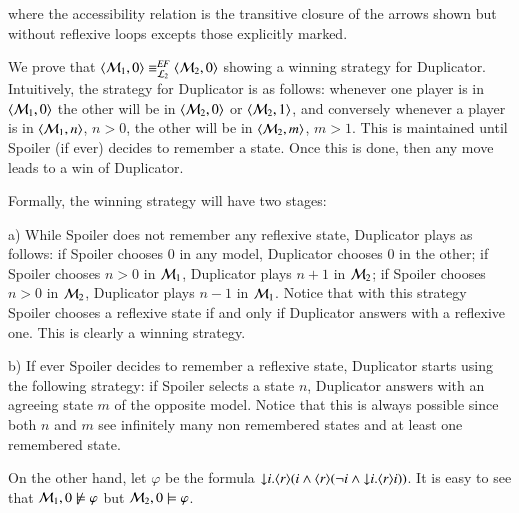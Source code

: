 \begin{pf}
\begin{center}
\end{center}

\noindent where the accessibility relation is the
transitive closure of the arrows shown but without reflexive
loops excepts those explicitly marked.


We prove that $\langle \mathcal{M}_1,0 \rangle\equiv^{\mathit{EF}}_{\mathcal{L}_2} \langle \mathcal{M}_2,0 \rangle$
showing a winning strategy for Duplicator. Intuitively, the strategy
for Duplicator is as follows: whenever one player is in
$\langle \mathcal{M}_1,0 \rangle$ the other will be in $\langle \mathcal{M}_2,0 \rangle$ or
$\langle \mathcal{M}_2,1 \rangle$, and conversely whenever a player is in
$\langle \mathcal{M}_1,n \rangle$, $n>0$, the other will be in $\langle \mathcal{M}_2,m \rangle$,
$m>1$. This is maintained until Spoiler (if ever) decides to
remember a state. Once this is done, then any move leads to a win of
Duplicator.

Formally, the winning strategy will have two stages:
\smallskip

\noindent
a) While Spoiler does not remember any reflexive
state, Duplicator plays as follows: if Spoiler
chooses $0$ in any model, Duplicator chooses $0$ in the other;
if Spoiler chooses $n>0$ in $\mathcal{M}_1$, Duplicator plays $n+1$ in
$\mathcal{M}_2$; if Spoiler chooses $n>0$ in $\mathcal{M}_2$, Duplicator plays
$n-1$ in $\mathcal{M}_1$. Notice that with this strategy Spoiler chooses
a reflexive state if and only if Duplicator answers with a reflexive
one. This is clearly a winning strategy.
\smallskip

\noindent
b) If ever Spoiler decides to
remember a reflexive state, Duplicator starts using the following
strategy: if Spoiler selects a state $n$, Duplicator answers with an
agreeing state $m$ of the opposite model. Notice that this is always
possible since both $n$ and $m$ see infinitely many non remembered
states and at least one remembered state.
\smallskip

\noindent
On the other hand, let $\varphi$ be the formula ${\downarrow} i. \langle r \rangle(i
\land \langle r \rangle(\lnot i \land {\downarrow} i.\langle r \rangle i))$. It is easy to see
that $\mathcal{M}_1, 0 \not \models \varphi$ but $\mathcal{M}_2, 0 \models
\varphi$.
\end{pf}


